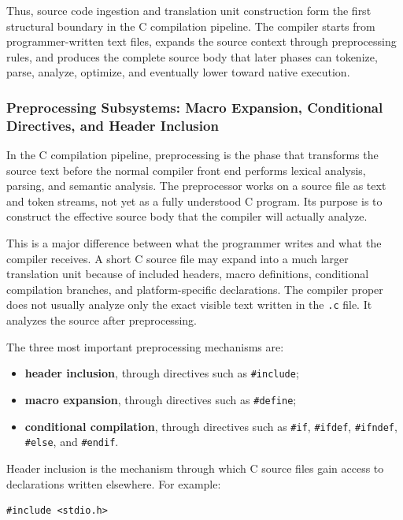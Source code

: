 Thus, source code ingestion and translation unit construction form the first structural boundary in the C compilation pipeline. The compiler starts from programmer-written text files, expands the source context through preprocessing rules, and produces the complete source body that later phases can tokenize, parse, analyze, optimize, and eventually lower toward native execution.


\subsubsection{Preprocessing Subsystems: Macro Expansion, Conditional Directives, and Header Inclusion}

In the C compilation pipeline, preprocessing is the phase that transforms the source text before the normal compiler front end performs lexical analysis, parsing, and semantic analysis. The preprocessor works on a source file as text and token streams, not yet as a fully understood C program. Its purpose is to construct the effective source body that the compiler will actually analyze.

This is a major difference between what the programmer writes and what the compiler receives. A short C source file may expand into a much larger translation unit because of included headers, macro definitions, conditional compilation branches, and platform-specific declarations. The compiler proper does not usually analyze only the exact visible text written in the \texttt{.c} file. It analyzes the source after preprocessing.

The three most important preprocessing mechanisms are:

\begin{itemize}
    \item \textbf{header inclusion}, through directives such as \texttt{\#include};
    \item \textbf{macro expansion}, through directives such as \texttt{\#define};
    \item \textbf{conditional compilation}, through directives such as \texttt{\#if}, \texttt{\#ifdef}, \texttt{\#ifndef}, \texttt{\#else}, and \texttt{\#endif}.
\end{itemize}

Header inclusion is the mechanism through which C source files gain access to declarations written elsewhere. For example:

\begin{verbatim}
#include <stdio.h>
\end{verbatim}

